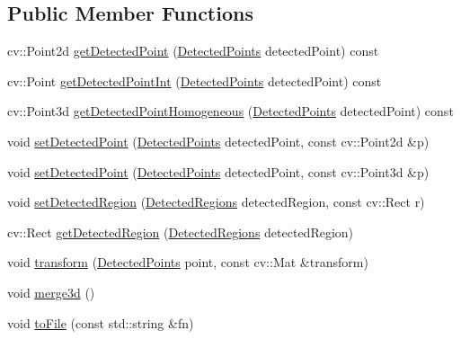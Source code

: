 \subsection*{Public Member Functions}
\begin{DoxyCompactItemize}
\item 
cv\+::\+Point2d \hyperlink{class_face3_d_1_1_face_geometry_a9ce57cf061663a02267d9fee423dbc73}{get\+Detected\+Point} (\hyperlink{class_face3_d_1_1_face_geometry_aab597f00966010882927a4974649bf11}{Detected\+Points} detected\+Point) const 
\item 
cv\+::\+Point \hyperlink{class_face3_d_1_1_face_geometry_a3c4e46361330951648193f24b8a5329d}{get\+Detected\+Point\+Int} (\hyperlink{class_face3_d_1_1_face_geometry_aab597f00966010882927a4974649bf11}{Detected\+Points} detected\+Point) const 
\item 
cv\+::\+Point3d \hyperlink{class_face3_d_1_1_face_geometry_a6aed421ae667cc1b67b4bf6a891ff634}{get\+Detected\+Point\+Homogeneous} (\hyperlink{class_face3_d_1_1_face_geometry_aab597f00966010882927a4974649bf11}{Detected\+Points} detected\+Point) const 
\item 
void \hyperlink{class_face3_d_1_1_face_geometry_a0cbcfd1b63284e1d1fa1f91a87b8f06a}{set\+Detected\+Point} (\hyperlink{class_face3_d_1_1_face_geometry_aab597f00966010882927a4974649bf11}{Detected\+Points} detected\+Point, const cv\+::\+Point2d \&p)
\item 
void \hyperlink{class_face3_d_1_1_face_geometry_a737543f3299fee8c845f2af2e25355e1}{set\+Detected\+Point} (\hyperlink{class_face3_d_1_1_face_geometry_aab597f00966010882927a4974649bf11}{Detected\+Points} detected\+Point, const cv\+::\+Point3d \&p)
\item 
void \hyperlink{class_face3_d_1_1_face_geometry_a9728c2a48b99682f74910f8924cc3f91}{set\+Detected\+Region} (\hyperlink{class_face3_d_1_1_face_geometry_a6db32685a7f429d507b8e31f7c42fe77}{Detected\+Regions} detected\+Region, const cv\+::\+Rect r)
\item 
cv\+::\+Rect \hyperlink{class_face3_d_1_1_face_geometry_a85251824e8909cca4d35461744ccc40f}{get\+Detected\+Region} (\hyperlink{class_face3_d_1_1_face_geometry_a6db32685a7f429d507b8e31f7c42fe77}{Detected\+Regions} detected\+Region)
\item 
void \hyperlink{class_face3_d_1_1_face_geometry_a876baec2ea039287ec5d45784d9b0242}{transform} (\hyperlink{class_face3_d_1_1_face_geometry_aab597f00966010882927a4974649bf11}{Detected\+Points} point, const cv\+::\+Mat \&transform)
\item 
void \hyperlink{class_face3_d_1_1_face_geometry_a653c167dc85c8eb861fa8fba73ecfd72}{merge3d} ()
\item 
void \hyperlink{class_face3_d_1_1_face_geometry_a7ff82baf7bb2a3f2ddc883a34e9ca945}{to\+File} (const std\+::string \&fn)
\end{DoxyCompactItemize}
